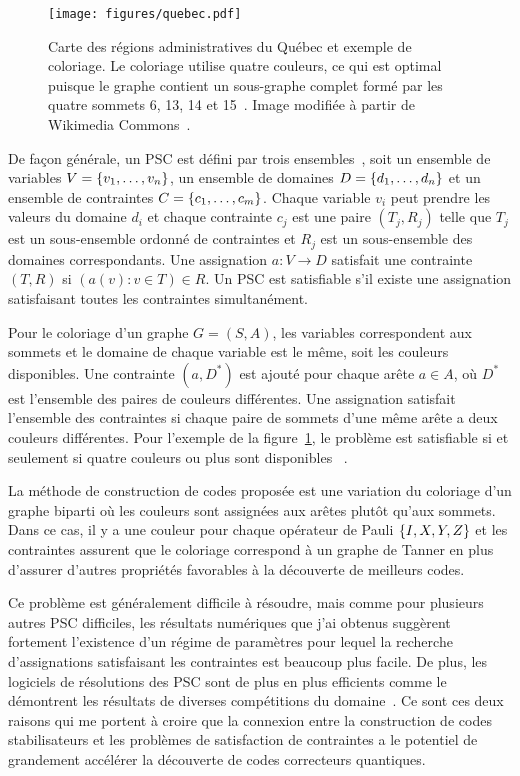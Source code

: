 \begin{figure}
  \begin{center}
    \texttt{[image: figures/quebec.pdf]}
  \end{center}
  \caption[Exemple du problème de coloriage d'une carte]{
    Carte des régions administratives du Québec et exemple de coloriage. 
    Le coloriage utilise quatre couleurs,
    ce qui est optimal puisque le graphe contient un sous-graphe complet
    formé par les quatre sommets 6, 13, 14 et 15~\cite{kubale_graph_2004}.
    Image modifiée à partir de Wikimedia Commons~\cite{noauthor_carte_2016}.
  }
  \label{fig:quebec}
\end{figure}

De façon générale,
un PSC est défini par trois ensembles~\cite{lecoutre_constraint_2009},
soit un ensemble de variables $V = \qty{v_1, \ldots, v_n}$,
un ensemble de domaines $D = \qty{d_1, \ldots, d_n}$
et un ensemble de contraintes $C = \qty{c_1, \ldots, c_m}$.
Chaque variable $v_i$ peut prendre les valeurs du domaine $d_i$
et chaque contrainte $c_j$ est une paire $(T_j, R_j)$
telle que $T_j$ est un sous-ensemble ordonné de contraintes et $R_j$
est un sous-ensemble des domaines correspondants.
Une assignation $a: V \to D$ satisfait une contrainte $(T, R)$ 
si $(a(v) : v \in T) \in R$.
Un PSC est satisfiable s'il existe une assignation 
satisfaisant toutes les contraintes simultanément.

Pour le coloriage d'un graphe $G = (S, A)$,
les variables correspondent aux sommets
et le domaine de chaque variable est le même,
soit les couleurs disponibles.
Une contrainte $(a, D^*)$ est ajouté pour chaque arête $a \in A$,
où $D^*$ est l'ensemble des paires de couleurs différentes.
Une assignation satisfait l'ensemble des contraintes 
si chaque paire de sommets d'une même arête a deux couleurs différentes.
Pour l'exemple de la figure~\ref{fig:quebec},
le problème est satisfiable si et seulement si quatre couleurs 
ou plus sont disponibles ~\cite{kubale_graph_2004}.

La méthode de construction de codes proposée est une variation 
du coloriage d'un graphe biparti où les couleurs sont assignées aux arêtes plutôt qu'aux sommets.
Dans ce cas, il y a une couleur pour chaque opérateur de Pauli $\qty{I, X, Y, Z}$
et les contraintes assurent que le coloriage correspond à un graphe de Tanner
en plus d'assurer d'autres propriétés favorables à la découverte de meilleurs codes.

Ce problème est généralement difficile à résoudre,
mais comme pour plusieurs autres PSC difficiles,
les résultats numériques que j'ai obtenus suggèrent fortement
l'existence d'un régime de paramètres pour lequel la recherche d'assignations
satisfaisant les contraintes est beaucoup plus facile.
De plus,
les logiciels de résolutions des PSC sont de plus en plus efficients comme le démontrent les résultats
de diverses compétitions du domaine~\cite{noauthor_minizinc_nodate, noauthor_sat_nodate}.
Ce sont ces deux raisons qui me portent à croire que la connexion entre la construction de 
codes stabilisateurs et les problèmes de satisfaction de contraintes a le potentiel de grandement accélérer la découverte de codes correcteurs quantiques.

